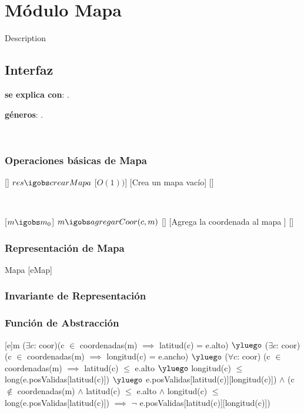 \section{Módulo Mapa}

Description %

\subsection{Interfaz}

	\textbf{se explica con}: .

	\textbf{géneros}: .

~

\subsubsection{Operaciones básicas de Mapa}

[]
{$res \igobs crearMapa$}
[$O(1))$]
[Crea un mapa vacío]
[]

~

[$m \igobs m_0$]
{$m \igobs agregarCoor(c,m)$}
[]
[Agrega la coordenada al mapa ]
[]

\subsubsection{Representación de Mapa}

\begin{Estructura}{ Mapa }[eMap]
	\begin{Tupla}[eMap]
	\end{Tupla}
\end{Estructura}

\subsubsection{Invariante de Representación}



\subsubsection{Función de Abstracción}

[e]{m}
{
	($\exists c$: coor)(c $\in$ coordenadas(m) $\implies$ latitud(c) = e.alto) $\yluego$
	($\exists c$: coor)(c $\in$ coordenadas(m) $\implies$ longitud(c) = e.ancho) $\yluego$
	($\forall c$: coor)
		(c $\in$ coordenadas(m) $\implies$ 
			latitud(c) $\leq$ e.alto $\yluego$
			longitud(c) $\leq$ long(e.posValidas[latitud(c)]) $\yluego$ 
			e.posValidas[latitud(c)][longitud(c)]) $\land$
		(c $\not\in$ coordenadas(m) $\land$ latitud(c) $\leq$ e.alto $\land$ longitud(c) $\leq$ long(e.posValidas[latitud(c)]) $\implies$ $\neg$ e.posValidas[latitud(c)][longitud(c)])
}

